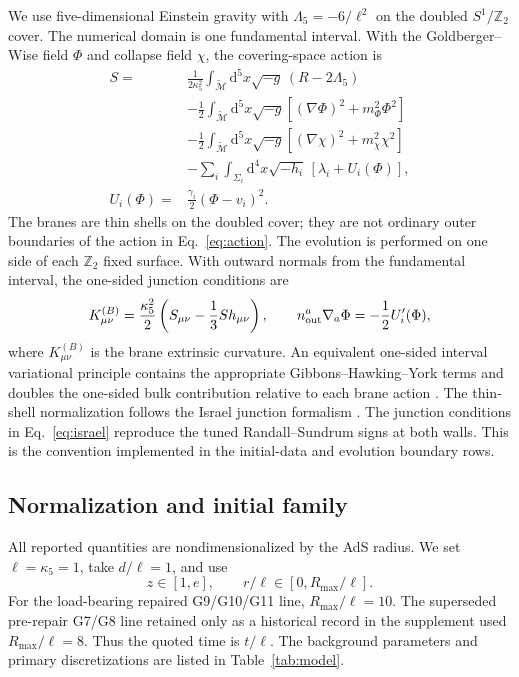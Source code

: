 \documentclass[11pt]{article}
\newcommand{\dd}{\mathrm{d}}
\begin{document}
We use five-dimensional Einstein gravity with
$\Lambda_5=-6/\ell^2$ on the doubled $S^1/\mathbb Z_2$ cover.  The numerical
domain is one fundamental interval.  With the Goldberger--Wise field $\Phi$
and collapse field $\chi$, the covering-space action is
\begin{align}
S={}&\frac{1}{2\kappa_5^2}\int_{\widetilde{\mathcal M}}
 \dd^5x\sqrt{-g}\,(R-2\Lambda_5) \nonumber\\
&-\frac12\int_{\widetilde{\mathcal M}}\dd^5x\sqrt{-g}
 \left[(\nabla\Phi)^2+m_\Phi^2\Phi^2\right] \nonumber\\
&-\frac12\int_{\widetilde{\mathcal M}}\dd^5x\sqrt{-g}
 \left[(\nabla\chi)^2+m_\chi^2\chi^2\right] \nonumber\\
&-\sum_i\int_{\Sigma_i}\dd^4x\sqrt{-h_i}
 \,[\lambda_i+U_i(\Phi)], \nonumber\\
U_i(\Phi)={}&\frac{\gamma_i}{2}(\Phi-v_i)^2.
\label{eq:action}
\end{align}
The branes are thin shells on the doubled cover; they are not ordinary outer
boundaries of the action in Eq.~\eqref{eq:action}.  The evolution is performed
on one side of each $\mathbb Z_2$ fixed surface.  With outward normals from the
fundamental interval, the one-sided junction conditions are
\begin{equation}
K^{(B)}_{\mu\nu}
=\frac{\kappa_5^2}{2}\left(S_{\mu\nu}-\frac13S h_{\mu\nu}\right),
\qquad
n_{\rm out}^a\nabla_a\Phi=-\frac12U_i'(\Phi),
\label{eq:israel}
\end{equation}
where $K^{(B)}_{\mu\nu}$ is the brane extrinsic curvature.  An equivalent
one-sided interval variational principle contains the appropriate
Gibbons--Hawking--York terms and doubles the one-sided bulk contribution
relative to each brane action \cite{GibbonsHawking1977,BattyeCarter2001}.
The thin-shell normalization follows the Israel junction formalism
\cite{Israel1966}.
The junction conditions in Eq.~\eqref{eq:israel} reproduce the tuned
Randall--Sundrum signs at both walls.  This is the convention implemented in
the initial-data and evolution boundary rows.

\subsection{Normalization and initial family}

All reported quantities are nondimensionalized by the AdS radius.  We set
$\ell=\kappa_5=1$, take $d/\ell=1$, and use
\begin{equation}
z\in[1,e],\qquad r/\ell\in[0,R_{\max}/\ell].
\end{equation}
For the load-bearing repaired G9/G10/G11 line,
$R_{\max}/\ell=10$.  The superseded pre-repair G7/G8 line retained only as a
historical record in the supplement used $R_{\max}/\ell=8$.  Thus the quoted
time is $t/\ell$.  The background parameters and primary discretizations are
listed in Table~\ref{tab:model}.
\end{document}
